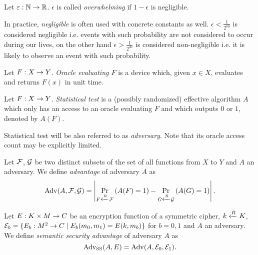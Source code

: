 \begin{defn}
\label{def:overwh}
	Let $\varepsilon:\mathbb{N}\rightarrow\mathbb{R}$. $\epsilon$ is called {\em overwhelming} if $1-\epsilon$ is negligible.
\end{defn}

\begin{note}
\label{note:neglconst}
	In practice, {\em negligible} is often used with concrete constants as well. $\epsilon<\frac{1}{2^{80}}$ is considered negligible i.e. events with such probability are not considered to occur during our lives, on the other hand $\epsilon>\frac{1}{2^{30}}$ is considered non-negligible i.e. it is likely to observe an event with such probability.
\end{note}


\begin{defn}[Oracle]
	Let $F:X\rightarrow Y$. {\em Oracle evaluating $F$} is a device which, given $x\in X$, evaluates and returns $F(x)$ in unit time.
\end{defn}

\begin{defn}   %
	Let $F:X\rightarrow Y$. {\em Statistical test} is a (possibly randomized) effective algorithm $A$ which only has an access to an oracle evaluating $F$ and which outputs $0$ or $1$, denoted by $A(F)$.
\end{defn}

\begin{note}
	Statistical test will be also referred to as {\em adversary}. Note that its oracle access count may be explicitly limited.
\end{note}


\begin{defn}[Advantage]
\label{def:advant}
	Let $\cal F$, $\cal G$ be two distinct subsets of the set of all functions from $X$ to $Y$ and $A$ an adversary. We define {\em advantage} of adversary $A$ as
	\[
		\operatorname*{Adv}(A,{\cal F},{\cal G}) = \left| \Pr\limits_{F\xleftarrow{R} {\cal F}}\left(A(F)=1\right) - \Pr\limits_{G\xleftarrow{R} {\cal G}}\left(A(G)=1\right) \right| .
	\]
\end{defn}

\begin{defn}
\label{def:ssadvant}
	Let $E: K\times M\rightarrow C$ be an encryption function of a symmetric cipher, $k\xleftarrow{R} K$, ${\cal E}_b = \{E_b:M^2\rightarrow C \mid E_b(m_0,m_1) = E(k,m_b)\}$ for $b=0,1$ and $A$ an adversary. We define {\em semantic security advantage} of adversary $A$ as
	\[
		\operatorname*{Adv_{SS}}(A,E) = \operatorname*{Adv}(A,{\cal E}_0,{\cal E}_1) .
	\]
\end{defn}

